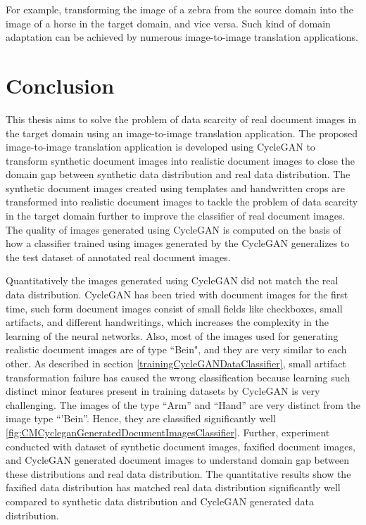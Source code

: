 For example, transforming the image of a zebra from the source domain into the image of a horse in the target domain, and vice versa. Such kind of domain adaptation can be achieved by numerous image-to-image translation applications.




\section{Conclusion}\label{Conclusion}

This thesis aims to solve the problem of data scarcity of real document images in the target domain using an image-to-image translation application. The proposed image-to-image translation application is developed using \ac{CycleGAN} to transform synthetic document images into realistic document images to close the domain gap between synthetic data distribution and real data distribution. The synthetic document images created using templates and handwritten crops are transformed into realistic document images to tackle the problem of data scarcity in the target domain further to improve the classifier of real document images. The quality of images generated using \ac{CycleGAN} is computed on the basis of how a classifier trained using images generated by the \ac{CycleGAN} generalizes to the test dataset of annotated real document images. 

Quantitatively the images generated using \ac{CycleGAN} did not match the real data distribution. \ac{CycleGAN} has been tried with document images for the first time, such form document images consist of small fields like checkboxes, small artifacts, and different handwritings, which increases the complexity in the learning of the neural networks. Also, most of the images used for generating realistic document images are of type ``Bein", and they are very similar to each other. As described in section \ref{trainingCycleGANDataClassifier}, small artifact transformation failure has caused the wrong classification because learning such distinct minor features present in training datasets by \ac{CycleGAN} is very challenging. The images of the type ``Arm'' and ``Hand'' are very distinct from the image type ``'Bein''. Hence, they are classified significantly well \ref{fig:CMCycleganGeneratedDocumentImagesClassifier}. Further, experiment conducted with dataset of synthetic document images, faxified document images, and \ac{CycleGAN} generated document images to understand domain gap between these distributions and real data distribution. The quantitative results show the faxified data distribution has matched real data distribution significantly well compared to synthetic data distribution and \ac{CycleGAN} generated data distribution. 


